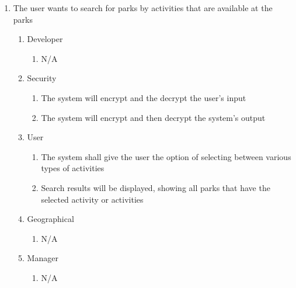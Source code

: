 \documentclass[titlepage]{article}
\begin{document}
\begin{enumerate}[{BE}1.]
    \item The user wants to search for parks by activities that are available at the parks
    \begin{enumerate}[{VP\theenumi}.1]
        \item Developer
            \begin{enumerate}
                \item N/A
            \end{enumerate}
        \item Security
            \begin{enumerate}
                \item The system will encrypt and the decrypt the user's input
                \item The system will encrypt and then decrypt the system's output
            \end{enumerate}
        \item User
            \begin{enumerate}
                \item The system shall give the user the option of selecting between various types
                of activities
                \item Search results will be displayed, showing all parks that have the selected
                activity or activities
            \end{enumerate}
        \item Geographical
            \begin{enumerate}
                \item N/A
            \end{enumerate}
        \item Manager
            \begin{enumerate}
                \item N/A
            \end{enumerate}
    \end{enumerate}


\end{enumerate}
\end{document}
